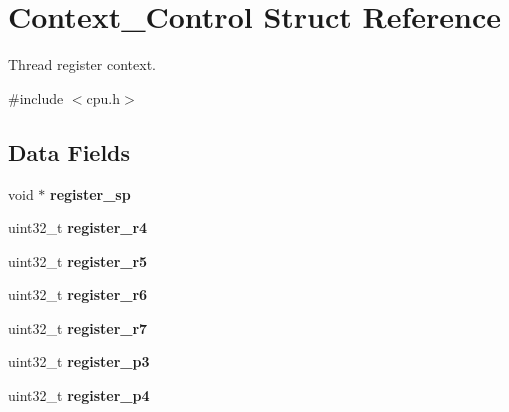 \hypertarget{structContext__Control}{}\section{Context\+\_\+\+Control Struct Reference}
\label{structContext__Control}


Thread register context.  




{\ttfamily \#include $<$cpu.\+h$>$}

\subsection*{Data Fields}
\begin{DoxyCompactItemize}
\item 
\mbox{\label{structContext__Control_aef3b3aac97e9d7211f07e825e75c7f18}} 
void $\ast$ {\bfseries register\+\_\+sp}
\item 
\mbox{\label{structContext__Control_a05ff737838f586018b0368a4afe0f846}} 
uint32\+\_\+t {\bfseries register\+\_\+r4}
\item 
\mbox{\label{structContext__Control_a238107a0877eb6ebf93247619aaeedb3}} 
uint32\+\_\+t {\bfseries register\+\_\+r5}
\item 
\mbox{\label{structContext__Control_a05df3d22755cedec25f8c54a6a47bb2c}} 
uint32\+\_\+t {\bfseries register\+\_\+r6}
\item 
\mbox{\label{structContext__Control_af4866edb6ee09a2d165045b09fba66b3}} 
uint32\+\_\+t {\bfseries register\+\_\+r7}
\item 
\mbox{\label{structContext__Control_ab435d2fcb10b45baaa085550f1e809ec}} 
uint32\+\_\+t {\bfseries register\+\_\+p3}
\item 
\mbox{\label{structContext__Control_af52a820eac764d77e7a0f1fbf502468d}} 
uint32\+\_\+t {\bfseries register\+\_\+p4}
\item 
\mbox{\label{structContext__Control_a8212ca45309fca329822802d64683379}} 

\end{DoxyCompactItemize}
